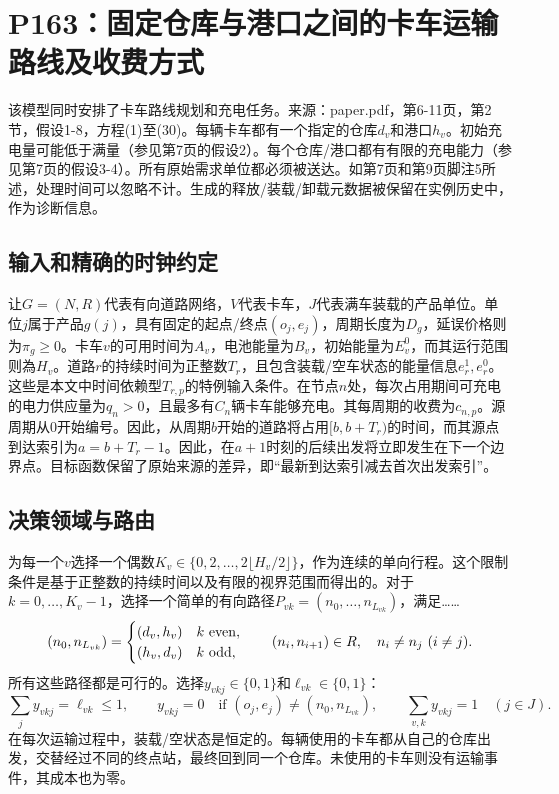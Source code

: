 \documentclass{article}
\begin{document}
\section*{P163：固定仓库与港口之间的卡车运输路线及收费方式}
该模型同时安排了卡车路线规划和充电任务。来源：paper.pdf，第6-11页，第2节，假设1-8，方程(1)至(30)。每辆卡车都有一个指定的仓库$d_v$和港口$h_v$。初始充电量可能低于满量（参见第7页的假设2）。每个仓库/港口都有有限的充电能力（参见第7页的假设3-4）。所有原始需求单位都必须被送达。如第7页和第9页脚注5所述，处理时间可以忽略不计。生成的释放/装载/卸载元数据被保留在实例历史中，作为诊断信息。

\subsection*{输入和精确的时钟约定}
让$G=(N,R)$代表有向道路网络，$V$代表卡车，$J$代表满车装载的产品单位。单位$j$属于产品$g(j)$，具有固定的起点/终点$(o_j,e_j)$，周期长度为$D_g$，延误价格则为$\pi_g\ge0$。卡车$v$的可用时间为$A_v$，电池能量为$B_v$，初始能量为$E_v^0$，而其运行范围则為$H_v$。道路$r$的持续时间为正整数$T_r$，且包含装载/空车状态的能量信息$e_r^1,e_r^0$。这些是本文中时间依赖型$T_{r,p}$的特例输入条件。在节点$n$处，每次占用期间可充电的电力供应量为$q_n>0$，且最多有$C_n$辆卡车能够充电。其每周期的收费为$c_{n,p}$。源周期从0开始编号。因此，从周期$b$开始的道路将占用$[b,b+T_r)$的时间，而其源点到达索引为$a=b+T_r-1$。因此，在$a+1$时刻的后续出发将立即发生在下一个边界点。目标函数保留了原始来源的差异，即“最新到达索引减去首次出发索引”。

\subsection*{决策领域与路由}
为每一个$v$选择一个偶数$K_v\in\{0,2,\ldots,2\lfloor H_v/2\rfloor\}$，作为连续的单向行程。这个限制条件是基于正整数的持续时间以及有限的视界范围而得出的。对于$k=0,\ldots,K_v-1$，选择一个简单的有向路径$P_{vk}=(n_0,\ldots,n_{L_{vk}})$，满足……
\[
 (n_0,n_{L_{vk}})=
 \begin{cases}(d_v,h_v)&k\ {\rm even},\\(h_v,d_v)&k\ {\rm odd},\end{cases}
 \qquad (n_i,n_{i+1})\in R,\quad n_i\ne n_j\ (i\ne j).
\]
所有这些路径都是可行的。选择$y_{vkj}\in\{0,1\}$和$\ell_{vk}\in\{0,1\}$：
\[
 \sum_j y_{vkj}=\ell_{vk}\le1,\qquad
 y_{vkj}=0\quad\text{if }(o_j,e_j)\ne(n_0,n_{L_{vk}}),\qquad
 \sum_{v,k}y_{vkj}=1\quad(j\in J).
\]
在每次运输过程中，装载/空状态是恒定的。每辆使用的卡车都从自己的仓库出发，交替经过不同的终点站，最终回到同一个仓库。未使用的卡车则没有运输事件，其成本也为零。
\end{document}
